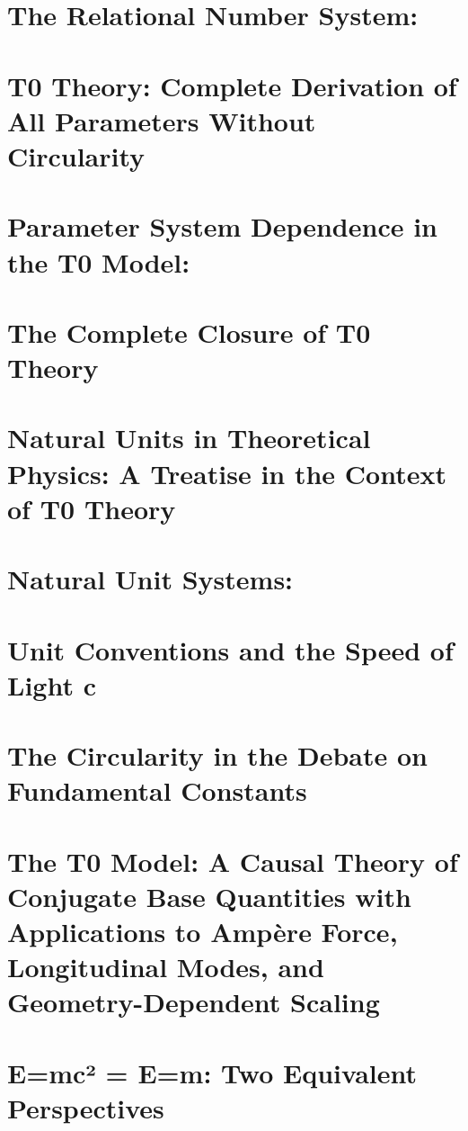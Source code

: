 \chapter{The Relational Number System:}

\chapter{T0 Theory: Complete Derivation of All Parameters Without Circularity}

\chapter{Parameter System Dependence in the T0 Model:}

\chapter{The Complete Closure of T0 Theory}

\chapter{Natural Units in Theoretical Physics: A Treatise in the Context of T0 Theory}

\chapter{Natural Unit Systems:}

\chapter{Unit Conventions and the Speed of Light c}

\chapter{The Circularity in the Debate on Fundamental Constants}

\chapter{The T0 Model: A Causal Theory of Conjugate Base Quantities with Applications to Ampère Force, Longitudinal Modes, and Geometry-Dependent Scaling}

\chapter{E=mc² = E=m: Two Equivalent Perspectives}

